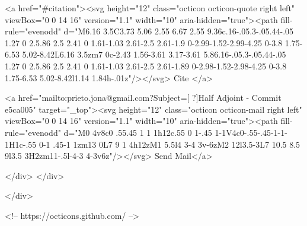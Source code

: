       <a  href="#citation"><svg height="12" class="octicon octicon-quote right left" viewBox="0 0 14 16" version="1.1" width="10" aria-hidden="true"><path fill-rule="evenodd" d="M6.16 3.5C3.73 5.06 2.55 6.67 2.55 9.36c.16-.05.3-.05.44-.05 1.27 0 2.5.86 2.5 2.41 0 1.61-1.03 2.61-2.5 2.61-1.9 0-2.99-1.52-2.99-4.25 0-3.8 1.75-6.53 5.02-8.42L6.16 3.5zm7 0c-2.43 1.56-3.61 3.17-3.61 5.86.16-.05.3-.05.44-.05 1.27 0 2.5.86 2.5 2.41 0 1.61-1.03 2.61-2.5 2.61-1.89 0-2.98-1.52-2.98-4.25 0-3.8 1.75-6.53 5.02-8.42l1.14 1.84h-.01z"/></svg> Cite
      </a>

      <a href="mailto:prieto.jona@gmail.com?Subject=[ ?]Half Adjoint - Commit e5ca005" target="_top"><svg height="12" class="octicon octicon-mail right left" viewBox="0 0 14 16" version="1.1" width="10" aria-hidden="true"><path fill-rule="evenodd" d="M0 4v8c0 .55.45 1 1 1h12c.55 0 1-.45 1-1V4c0-.55-.45-1-1-1H1c-.55 0-1 .45-1 1zm13 0L7 9 1 4h12zM1 5.5l4 3-4 3v-6zM2 12l3.5-3L7 10.5 8.5 9l3.5 3H2zm11-.5l-4-3 4-3v6z"/></svg> Send Mail</a>

    </div>
  </div>

</div>

<!-- https://octicons.github.com/ -->





